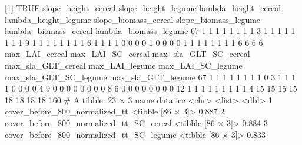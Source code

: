 [1] TRUE
   slope_height_cereal slope_height_legume lambda_height_cereal lambda_height_legume slope_biomass_cereal slope_biomass_legume lambda_biomass_cereal lambda_biomass_legume
67                   1                   1                    1                    1                    1                    1                     1                     1
3                    1                   1                    1                    1                    1                    1                     1                     1
9                    1                   1                    1                    1                    1                    1                     1                     1
6                    1                   1                    1                    1                    0                    0                     0                     0
1                    0                   0                    0                    0                    1                    1                     1                     1
                     1                   1                    1                    1                    6                    6                     6                     6
   max_LAI_cereal max_LAI_SC_cereal max_sla_GLT_SC_cereal max_sla_GLT_cereal max_LAI_legume max_LAI_SC_legume max_sla_GLT_SC_legume max_sla_GLT_legume    
67              1                 1                     1                  1              1                 1                     1                  1   0
3               1                 1                     1                  1              0                 0                     0                  0   4
9               0                 0                     0                  0              0                 0                     0                  0   8
6               0                 0                     0                  0              0                 0                     0                  0  12
1               1                 1                     1                  1              1                 1                     1                  1   4
               15                15                    15                 15             18                18                    18                 18 160
# A tibble: 23 × 3
   name                                     data                icc
   <chr>                                    <list>            <dbl>
 1 cover_before_800_normalized_tt           <tibble [86 × 3]> 0.887
 2 cover_before_800_normalized_tt_SC_cereal <tibble [86 × 3]> 0.884
 3 cover_before_800_normalized_tt_SC_legume <tibble [86 × 3]> 0.833
